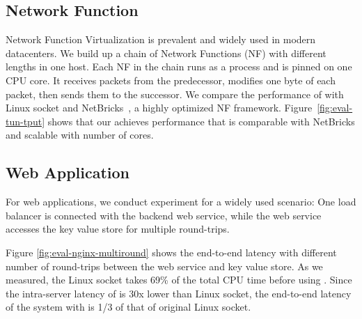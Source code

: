 \subsection{Network Function}

Network Function Virtualization is prevalent and widely used in modern datacenters. We build up a chain of Network Functions (NF) with different lengths in one host. Each NF in the chain runs as a process and is pinned on one CPU core. It receives packets from the predecessor, modifies one byte of each packet, then sends them to the successor. We compare the performance of \sys{} with Linux socket and NetBricks~\cite{panda2016netbricks}, a highly optimized NF framework. Figure~\ref{fig:eval-tun-tput} shows that our \sys achieves performance that is comparable with NetBricks and scalable with number of cores.



\subsection{Web Application}
For web applications, we conduct experiment for a widely used scenario: One load balancer is connected with the backend web service, while the web service accesses the key value store for multiple round-trips.

Figure \ref{fig:eval-nginx-multiround} shows the end-to-end latency with different number of round-trips between the web service and key value store. As we measured, the Linux socket takes 69\% of the total CPU time before using \libipc. Since the intra-server latency of \sys{} is 30x lower than Linux socket, the end-to-end latency of the system with \sys{}  is 1/3 of that of original Linux socket.








